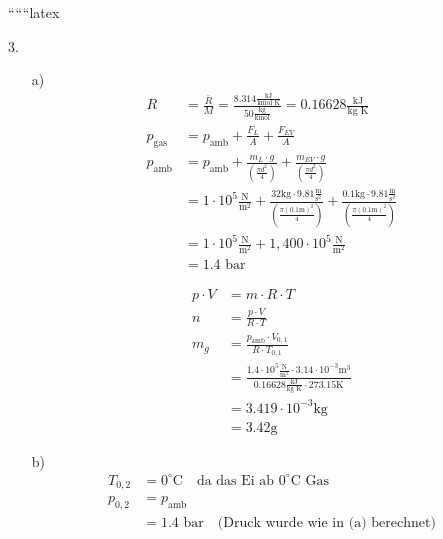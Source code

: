 
``````latex


3. 
\begin{itemize}
    \item[a)] 
    \begin{align*}
        R &= \frac{\bar{R}}{M} = \frac{8.314 \frac{\text{kJ}}{\text{kmol K}}}{50 \frac{\text{kg}}{\text{kmol}}} = 0.16628 \frac{\text{kJ}}{\text{kg K}} \\
        p_{\text{gas}} &= p_{\text{amb}} + \frac{F_L}{A} + \frac{F_{EV}}{A} \\
        p_{\text{amb}} &= p_{\text{amb}} + \frac{m_L \cdot g}{\left(\frac{\pi d^2}{4}\right)} + \frac{m_{EV} \cdot g}{\left(\frac{\pi d^2}{4}\right)} \\
        &= 1 \cdot 10^5 \frac{\text{N}}{\text{m}^2} + \frac{32 \text{kg} \cdot 9.81 \frac{\text{m}}{\text{s}^2}}{\left(\frac{\pi (0.1 \text{m})^2}{4}\right)} + \frac{0.1 \text{kg} \cdot 9.81 \frac{\text{m}}{\text{s}^2}}{\left(\frac{\pi (0.1 \text{m})^2}{4}\right)} \\
        &= 1 \cdot 10^5 \frac{\text{N}}{\text{m}^2} + 1,400 \cdot 10^5 \frac{\text{N}}{\text{m}^2} \\
        &= 1.4 \text{ bar}
    \end{align*}
    
    \begin{align*}
        p \cdot V &= m \cdot R \cdot T \\
        n &= \frac{p \cdot V}{R \cdot T} \\
        m_g &= \frac{p_{\text{amb}} \cdot V_{0,1}}{R \cdot T_{0,1}} \\
        &= \frac{1.4 \cdot 10^5 \frac{\text{N}}{\text{m}^2} \cdot 3.14 \cdot 10^{-3} \text{m}^3}{0.16628 \frac{\text{kJ}}{\text{kg K}} \cdot 273.15 \text{K}} \\
        &= 3.419 \cdot 10^{-3} \text{kg} \\
        &= 3.42 \text{g}
    \end{align*}
    
    \item[b)] 
    \begin{align*}
        T_{0,2} &= 0^\circ \text{C} \quad \text{da das Ei ab } 0^\circ \text{C Gas} \\
        p_{0,2} &= p_{\text{amb}} \\
        &= 1.4 \text{ bar} \quad \text{(Druck wurde wie in (a) berechnet)}
    \end{align*}
\end{itemize}

